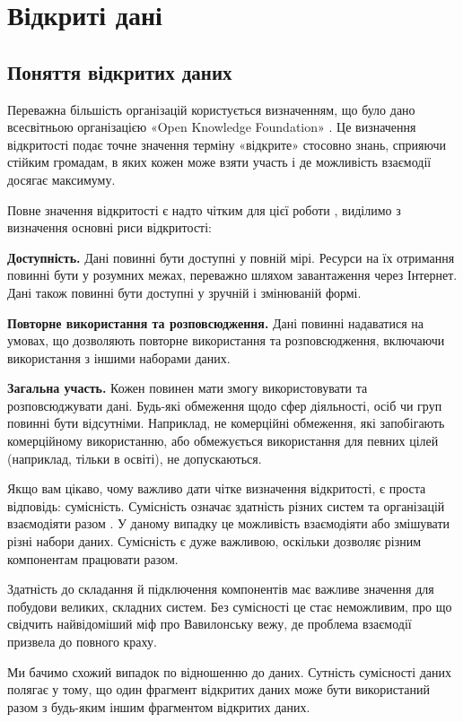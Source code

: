 \chapter{Відкриті дані}

\section{Поняття відкритих даних}

Переважна більшість організацій користується визначенням, що було дано всесвітньою організацією «Open Knowledge Foundation» \cite{OpenDefinition}.
Це визначення відкритості подає точне значення терміну «відкрите» стосовно знань,
сприяючи стійким громадам, в яких кожен може взяти участь
і де можливість взаємодії досягає максимуму.

Повне значення відкритості є надто чітким для цієї роботи \cite{OpendataHandBook},
виділимо з визначення основні риси відкритості:

\textbf{Доступність.}
Дані повинні бути доступні у повній мірі. Ресурси на їх отримання повинні бути
у розумних межах, переважно шляхом завантаження через Інтернет.
Дані також повинні бути доступні у зручній і змінюваній формі.

\textbf{Повторне використання та розповсюдження.}
Дані повинні надаватися на умовах, що дозволяють повторне
використання та розповсюдження, включаючи
використання з іншими наборами даних.

\textbf{Загальна участь.}
Кожен повинен мати змогу використовувати та розповсюджувати дані.
Будь-які обмеження щодо сфер діяльності, осіб чи груп повинні бути відсутніми.
Наприклад, не комерційні обмеження, які запобігають комерційному використанню,
або обмежується використання для певних цілей (наприклад, тільки в освіті), не допускаються.

Якщо вам цікаво, чому важливо дати чітке визначення відкритості, є проста відповідь: сумісність.
Сумісність означає здатність різних систем та організацій взаємодіяти разом \cite{BigDataOpenData}.
У даному випадку це можливість взаємодіяти або змішувати різні набори даних.
Сумісність є дуже важливою, оскільки дозволяє різним компонентам працювати разом.

Здатність до складання й підключення компонентів має важливе
значення для побудови великих, складних систем.
Без сумісності це стає неможливим, про що свідчить найвідоміший міф про
Вавилонську вежу, де проблема взаємодії призвела до повного краху.

Ми бачимо схожий випадок по відношенню до даних.
Сутність сумісності даних полягає у тому, що один фрагмент відкритих
даних може бути використаний разом з будь-яким іншим фрагментом відкритих даних.

